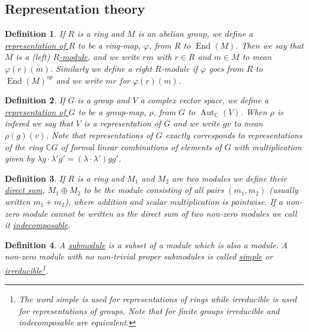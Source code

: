 \documentclass[11pt, a4paper, english]{article}
\numberwithin{prop}{section}
\numberwithin{lemma}{section}
\numberwithin{theorem}{section}
\newtheorem{defin}{Definition}
\numberwithin{defin}{section}
\numberwithin{example}{section}
\newcommand{\C}{\mathbb{C}}
\DeclareMathOperator{\End}{End}
\DeclareMathOperator{\Aut}{Aut}
\begin{document}
\begin{appendices}
\section{Representation theory}
\label{appendix}

\begin{defin}
If $R$ is a ring and $M$ is an abelian group, we define a \underline{representation of $R$} to be a ring-map, $\varphi$, from $R$ to $\End(M)$. Then we say that $M$ is a (left) \underline{$R$-module}, and we write $rm$ with $r \in R$ and $m \in M$ to mean $\varphi(r)(m)$. Similarly we define a right $R$-module if $\varphi$ goes from $R$ to $\End(M)^{op}$ and we write $mr$ for $\varphi(r)(m)$.
\end{defin}

\begin{defin}
If $G$ is a group and $V$ a complex vector space, we define a \underline{representation of $G$} to be a group-map, $\rho$, from $G$ to $\Aut_\C(V)$. When $\rho$ is infered we say that $V$ is a representation of $G$ and we write $gv$ to mean $\rho(g)(v)$. Note that representations of $G$ exactly corresponds to representations of the ring $\C G$ of formal linear combinations of elements of $G$ with multiplication given by $\lambda g \cdot \lambda' g' = (\lambda \cdot \lambda')gg'$.
\end{defin}

\begin{defin}
\label{def:indecomposable}
If $R$ is a ring and $M_1$ and $M_2$ are two modules we define their \underline{direct sum}, $M_1 \oplus M_2$ to be the module consisting of all pairs $(m_1, m_2)$ (usually written $m_1 + m_2$), where addition and scalar multiplication is pointwise. If a non-zero module cannot be written as the direct sum of two non-zero modules we call it \underline{indecomposable}.
\end{defin}

\begin{defin}
\label{def:simple}
A \underline{submodule} is a subset of a module which is also a module. A non-zero module with no non-trivial proper submodules is called \underline{simple} or \underline{irreducible}\footnote{The word simple is used for representations of rings while irreducible is used for representations of groups. Note that for finite groups irreducible and indecomposable are equivalent.}.
\end{defin}


\end{appendices}
\end{document}
